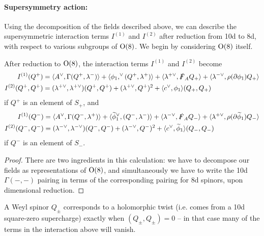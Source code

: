\documentclass[10pt, oneside]{article}
\begin{document}
\vspace{-10pt}
\paragraph{Supersymmetry action:} 
Using the decomposition of the fields described above, we can describe the supersymmetric interaction terms $I^{(1)}$ and $I^{(2)}$ after reduction from 10d to 8d, with respect to various subgroups of $\mathrm{O}(8)$.  We begin by considering $\mathrm{O}(8)$ itself.

\begin{prop} \label{O8_decomposition_of_susy_prop}
After reduction to $\mathrm{O}(8)$, the interaction terms $I^{(1)}$ and $I^{(2)}$ become
\begin{align*}
I^{(1)}(Q^+) &= \langle A^\vee, \Gamma(Q^+, \lambda^-)\rangle + \langle \phi_1,^\vee (Q^+,\lambda^+)\rangle + \langle \lambda^{+\vee}, \slashed{F}_A Q_+ \rangle + \langle \lambda^{-\vee}, \rho(\partial \phi_1)Q_+ \rangle\\
I^{(2)}(Q^+, Q^+) &= (\lambda^{+\vee}, \lambda^{+\vee})(Q^+,Q^+) + (\lambda^{+\vee},Q^+)^2 + \langle c^\vee, \phi_1\rangle(Q_+,Q_+)
\end{align*}
if $Q^+$ is an element of $S_+$, and
\begin{align*}
I^{(1)}(Q^-) &= \langle A^\vee, \Gamma(Q^-, \lambda^+)\rangle + \langle \widetilde{\phi}_1^\vee, (Q^-,\lambda^-)\rangle+ \langle \lambda^{-\vee}, \slashed{F}_A Q_- \rangle + \langle \lambda^{+\vee}, \rho(\partial \widetilde{\phi}_1)Q_- \rangle\\
I^{(2)}(Q^-, Q^-) &= (\lambda^{-\vee}, \lambda^{-\vee})(Q^-,Q^-) + (\lambda^{-\vee},Q^-)^2 + \langle c^\vee, \widetilde{\phi}_1\rangle(Q_-,Q_-)
\end{align*}
if $Q^-$ is an element of $S_-$.
\end{prop}

\begin{proof}
There are two ingredients in this calculation: we have to decompose our fields as representations of $\mathrm{O}(8)$, and simultaneously we have to write the 10d $\Gamma(-,-)$ pairing in terms of the corresponding pairing for 8d spinors, upon dimensional reduction. 
\end{proof}

\begin{remark}
A Weyl spinor $Q_\pm$ corresponds to a holomorphic twist (i.e. comes from a 10d square-zero supercharge) exactly when $(Q_\pm,Q_\pm)=0$ -- in that case many of the terms in the interaction above will vanish.
\end{remark}
\end{document}
